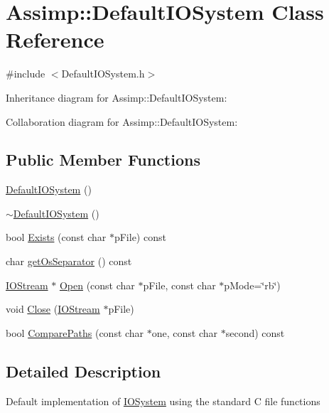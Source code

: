 \hypertarget{class_assimp_1_1_default_i_o_system}{\section{Assimp\+:\+:Default\+I\+O\+System Class Reference}
\label{class_assimp_1_1_default_i_o_system}
}


{\ttfamily \#include $<$Default\+I\+O\+System.\+h$>$}



Inheritance diagram for Assimp\+:\+:Default\+I\+O\+System\+:


Collaboration diagram for Assimp\+:\+:Default\+I\+O\+System\+:
\subsection*{Public Member Functions}
\begin{DoxyCompactItemize}
\item 
\hyperlink{class_assimp_1_1_default_i_o_system_a66ee38380e035e7fac8abae8362c50a6}{Default\+I\+O\+System} ()
\item 
\hyperlink{class_assimp_1_1_default_i_o_system_ae375ae40f6210462afff305e0338ae56}{$\sim$\+Default\+I\+O\+System} ()
\item 
bool \hyperlink{class_assimp_1_1_default_i_o_system_a2db9d1b7fa0afcd92c977c06c7d64ac8}{Exists} (const char $\ast$p\+File) const 
\item 
char \hyperlink{class_assimp_1_1_default_i_o_system_afe0606d983752d2c60d2616892dd5246}{get\+Os\+Separator} () const 
\item 
\hyperlink{class_assimp_1_1_i_o_stream}{I\+O\+Stream} $\ast$ \hyperlink{class_assimp_1_1_default_i_o_system_a27da30fcb58f1fafe4a2e96ebef87d7e}{Open} (const char $\ast$p\+File, const char $\ast$p\+Mode=\char`\"{}rb\char`\"{})
\item 
void \hyperlink{class_assimp_1_1_default_i_o_system_a7e2993be6ab5ed060d79fe269a5d4950}{Close} (\hyperlink{class_assimp_1_1_i_o_stream}{I\+O\+Stream} $\ast$p\+File)
\item 
bool \hyperlink{class_assimp_1_1_default_i_o_system_aa46912c92a9207723fa012d2bf21d494}{Compare\+Paths} (const char $\ast$one, const char $\ast$second) const 
\end{DoxyCompactItemize}


\subsection{Detailed Description}
Default implementation of \hyperlink{class_assimp_1_1_i_o_system}{I\+O\+System} using the standard C file functions 

